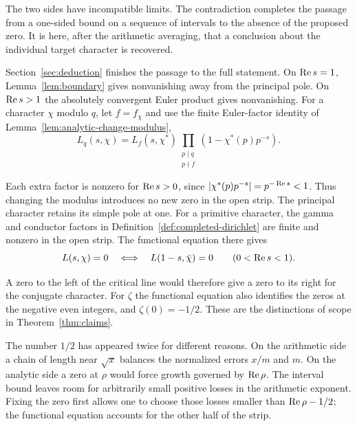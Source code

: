 The two sides have incompatible limits. The contradiction completes
the passage from a one-sided bound on a sequence of intervals to
the absence of the proposed zero. It is here, after the arithmetic
averaging, that a conclusion about the individual target character
is recovered.

Section~\ref{sec:deduction} finishes the passage to the full
statement. On \(\operatorname{Re} s=1\), Lemma~\ref{lem:boundary} gives
nonvanishing away from the principal pole. On \(\operatorname{Re} s>1\) the
absolutely convergent Euler product gives nonvanishing. For a character \(\chi\) modulo \(q\), let \(f=f_\chi\)
and use the finite Euler-factor identity of
Lemma~\ref{lem:analytic-change-modulus},
\[
   L_q(s,\chi)=L_f(s,\chi^*)\prod_{\substack{p\mid q\\p\nmid f}}
                                  (1-\chi^*(p)p^{-s}).
\]

Each extra factor is nonzero for \(\operatorname{Re} s>0\), since
\(|\chi^*(p)p^{-s}|=p^{-\operatorname{Re} s}<1\). Thus changing the
modulus introduces no new zero in the open strip. The principal
character retains its simple pole at one. For a primitive character,
the gamma and conductor factors in Definition~\ref{def:completed-dirichlet}
are finite and nonzero in the open strip. The functional equation there gives
\[
        L(s,\chi)=0\quad\Longleftrightarrow\quad
              L(1-s,\bar\chi)=0\qquad(0<\operatorname{Re} s<1).
\]

A zero to the left of the critical line would therefore give a
zero to its right for the conjugate character. For \(\zeta\) the
functional equation also identifies the zeros at the negative even
integers, and \(\zeta(0)=-1/2\). These are the distinctions of scope
in Theorem~\ref{thm:claims}. \cite[(25.15.5)]{dirichlet}
\cite[(25.4.1)--(25.4.4)]{zeta}

The number \(1/2\) has appeared twice for different reasons.
On the arithmetic side a chain of length near \(\sqrt x\) balances
the normalized errors \(x/m\) and \(m\). On the analytic side a
zero at \(\rho\) would force growth governed by \(\operatorname{Re}\rho\).
The interval bound leaves room for arbitrarily small positive
losses in the arithmetic exponent. Fixing the zero first allows
one to choose those losses smaller than \(\operatorname{Re}\rho-1/2\);
the functional equation accounts for the other half of the strip.
